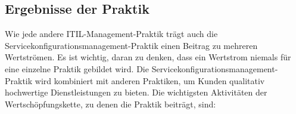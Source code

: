 %
%
%
%

\subsection{Ergebnisse der Praktik}
Wie jede andere ITIL-Management-Praktik trägt auch die Servicekonfigurationsmanagement-Praktik
einen Beitrag zu mehreren Wertströmen. Es ist wichtig, daran zu denken, dass ein Wertstrom niemals
für eine einzelne Praktik gebildet wird. Die Servicekonfigurationsmanagement-Praktik wird kombiniert mit anderen
Praktiken, um Kunden qualitativ hochwertige Dienstleistungen zu bieten. Die wichtigsten Aktivitäten der Wertschöpfungskette, zu denen
die Praktik beiträgt, sind:

